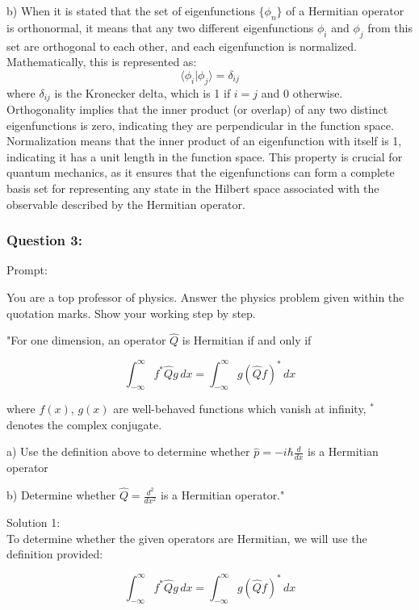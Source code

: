 \documentclass[a4paper,11pt]{article}
\begin{document}
b) When it is stated that the set of eigenfunctions \(\{ \phi_{n} \}\) of a Hermitian operator is orthonormal, it means that any two different eigenfunctions \(\phi_i\) and \(\phi_j\) from this set are orthogonal to each other, and each eigenfunction is normalized. Mathematically, this is represented as:
\[ \langle \phi_i | \phi_j \rangle = \delta_{ij} \]
where \(\delta_{ij}\) is the Kronecker delta, which is 1 if \(i = j\) and 0 otherwise. Orthogonality implies that the inner product (or overlap) of any two distinct eigenfunctions is zero, indicating they are perpendicular in the function space. Normalization means that the inner product of an eigenfunction with itself is 1, indicating it has a unit length in the function space. This property is crucial for quantum mechanics, as it ensures that the eigenfunctions can form a complete basis set for representing any state in the Hilbert space associated with the observable described by the Hermitian operator.

\subsubsection*{Question 3:}

Prompt:
\begin{spverbatim}
    You are a top professor of physics. Answer the physics problem given within the quotation marks. Show your working step by step.

    "For one dimension, an operator \( \hat{Q} \) is Hermitian if and only if 

    \[ \int_{-\infty}^{\infty} f^{*}\hat{Q}g \, dx = \int_{-\infty}^{\infty} g(\hat{Q}f)^{*} \, dx \]

    where \( f(x) \), \( g(x) \) are well-behaved functions which vanish at infinity, \( ^{*} \) denotes the complex conjugate. 

    a) Use the definition above to determine whether \( \hat{p} = -i\hbar\frac{d}{dx} \) is a Hermitian operator 

    b) Determine whether \( \hat{Q} = \frac{d^{2}}{dx^{2}} \) is a Hermitian operator."
\end{spverbatim}

\bigskip

\noindent Solution 1: \\

To determine whether the given operators are Hermitian, we will use the definition provided:

\[ \int_{-\infty}^{\infty} f^{*}\hat{Q}g \, dx = \int_{-\infty}^{\infty} g(\hat{Q}f)^{*} \, dx \]
\end{document}
